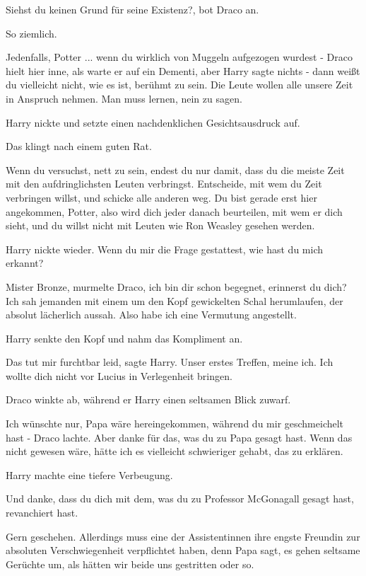 \glqq{}Siehst du keinen Grund für seine Existenz?\grqq{}, bot Draco an.

\glqq{}So ziemlich.\grqq{}

\glqq{}Jedenfalls, Potter ... wenn du wirklich von Muggeln aufgezogen wurdest
-\grqq{} Draco hielt hier inne, als warte er auf ein Dementi, aber Harry sagte
nichts \glqq{}- dann weißt du vielleicht nicht, wie es ist, berühmt zu sein. Die
Leute wollen alle unsere Zeit in Anspruch nehmen. Man muss lernen, nein zu
sagen.\grqq{}

Harry nickte und setzte einen nachdenklichen Gesichtsausdruck auf.

\glqq{}Das klingt nach einem guten Rat.\grqq{}

\glqq{}Wenn du versuchst, nett zu sein, endest du nur damit, dass du die meiste
Zeit mit den aufdringlichsten Leuten verbringst. Entscheide, mit wem du Zeit
verbringen willst, und schicke alle anderen weg. Du bist gerade erst hier
angekommen, Potter, also wird dich jeder danach beurteilen, mit wem er dich
sieht, und du willst nicht mit Leuten wie Ron Weasley gesehen werden.\grqq{}

Harry nickte wieder. \glqq{}Wenn du mir die Frage gestattest, wie hast du mich
erkannt?\grqq{}

\glqq{}Mister Bronze\grqq{}, murmelte Draco, \glqq{}ich bin dir schon begegnet,
erinnerst du dich? Ich sah jemanden mit einem um den Kopf gewickelten Schal
herumlaufen, der absolut lächerlich aussah. Also habe ich eine Vermutung
angestellt.\grqq{}

Harry senkte den Kopf und nahm das Kompliment an.

\glqq{}Das tut mir furchtbar leid\grqq{}, sagte Harry. \glqq{}Unser erstes
Treffen, meine ich. Ich wollte dich nicht vor Lucius in Verlegenheit
bringen.\grqq{}

Draco winkte ab, während er Harry einen seltsamen Blick zuwarf.

\glqq{}Ich wünschte nur, Papa wäre hereingekommen, während du mir geschmeichelt
hast -\grqq{} Draco lachte. \glqq{}Aber danke für das, was du zu Papa gesagt
hast. Wenn das nicht gewesen wäre, hätte ich es vielleicht schwieriger gehabt,
das zu erklären.\grqq{}

Harry machte eine tiefere Verbeugung.

\glqq{}Und danke, dass du dich mit dem, was du zu Professor McGonagall gesagt
hast, revanchiert hast.\grqq{}

\glqq{}Gern geschehen. Allerdings muss eine der Assistentinnen ihre engste
Freundin zur absoluten Verschwiegenheit verpflichtet haben, denn Papa sagt, es
gehen seltsame Gerüchte um, als hätten wir beide uns gestritten oder so.\grqq{}

